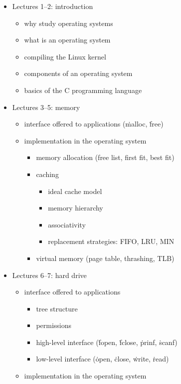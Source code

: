 \begin{itemize}
\item Lectures 1--2: introduction
  \begin{itemize}
  \item why study operating systems
  \item what is an operating system
  \item compiling the Linux kernel
  \item components of an operating system
  \item basics of the C programming language
  \end{itemize}
\item Lectures 3--5: memory
  \begin{itemize}
  \item interface offered to applications (\.{malloc}, \.{free})
  \item implementation in the operating system
    \begin{itemize}
    \item memory allocation (free list, first fit, best fit)
    \item caching
      \begin{itemize}
      \item ideal cache model
      \item memory hierarchy
      \item associativity
      \item replacement strategies: FIFO, LRU, MIN
      \end{itemize}
    \item virtual memory (page table, thrashing, TLB)
    \end{itemize}
  \end{itemize}
\item Lectures 6--7: hard drive
  \begin{itemize}
  \item interface offered to applications
    \begin{itemize}
    \item tree structure
    \item permissions
    \item high-level interface (\.{fopen}, \.{fclose}, \.{prinf}, \.{scanf})
    \item low-level interface (\.{open}, \.{close}, \.{write}, \.{read})
    \end{itemize}
  \item implementation in the operating system
    \begin{itemize}

\end{itemize}
\end{itemize}
\end{itemize}
